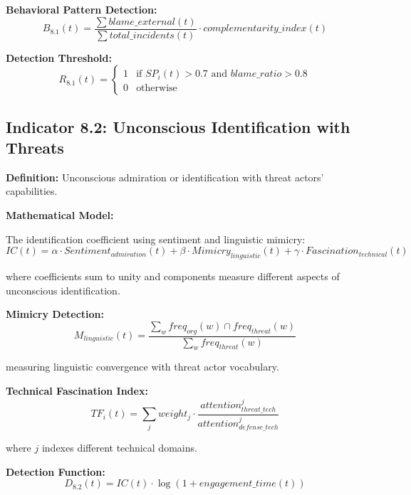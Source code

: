 \documentclass[11pt,a4paper]{article}
\begin{document}
\textbf{Behavioral Pattern Detection:}
\begin{equation}
B_{8.1}(t) = \frac{\sum blame\_external(t)}{\sum total\_incidents(t)} \cdot complementarity\_index(t)
\end{equation}

\textbf{Detection Threshold:}
\begin{equation}
R_{8.1}(t) = \begin{cases}
1 & \text{if } SP_i(t) > 0.7 \text{ and } blame\_ratio > 0.8 \\
0 & \text{otherwise}
\end{cases}
\end{equation}

\subsection{Indicator 8.2: Unconscious Identification with Threats}

\textbf{Definition:} Unconscious admiration or identification with threat actors' capabilities.

\textbf{Mathematical Model:}

The identification coefficient using sentiment and linguistic mimicry:
\begin{equation}
IC(t) = \alpha \cdot Sentiment_{admiration}(t) + \beta \cdot Mimicry_{linguistic}(t) + \gamma \cdot Fascination_{technical}(t)
\end{equation}

where coefficients sum to unity and components measure different aspects of unconscious identification.

\textbf{Mimicry Detection:}
\begin{equation}
M_{linguistic}(t) = \frac{\sum_{w} freq_{org}(w) \cap freq_{threat}(w)}{\sum_{w} freq_{threat}(w)}
\end{equation}

measuring linguistic convergence with threat actor vocabulary.

\textbf{Technical Fascination Index:}
\begin{equation}
TF_i(t) = \sum_{j} weight_j \cdot \frac{attention_{threat\_tech}^j}{attention_{defense\_tech}^j}
\end{equation}

where $j$ indexes different technical domains.

\textbf{Detection Function:}
\begin{equation}
D_{8.2}(t) = IC(t) \cdot \log(1 + engagement\_time(t))
\end{equation}
\end{document}

